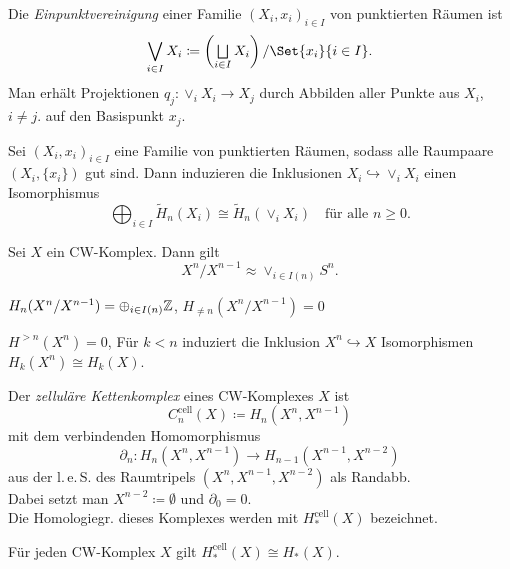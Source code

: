 \documentclass{cheat-sheet}
\newcommand{\RH}{\tilde{H}} %
\newcommand{\cell}{\text{cell}} %
\newcommand{\leS}{l.\,e.\,S.} %
\newcommand{\inlineitem}[1]{\textbullet \enspace #1} %
\begin{document}
\begin{defn}
  Die \emph{Einpunktvereinigung} einer Familie $(X_i, x_i)_{i \in I}$ von punktierten Räumen ist
  \[ \bigvee_{i \in I} X_i \coloneqq \left( \bigsqcup_{i \in I} X_i \right) / \Set{x_i}{i \in I}. \]
  Man erhält Projektionen $q_j : \vee_i X_i \to X_j$ durch Abbilden aller Punkte aus $X_i$, $i \not= j$. auf den Basispunkt $x_j$.
\end{defn}

\begin{prop}
  Sei $(X_i, x_i)_{i \in I}$ eine Familie von punktierten Räumen, sodass alle Raumpaare $(X_i, \{ x_i \})$ gut sind. Dann induzieren die Inklusionen $X_i \hookrightarrow \vee_i X_i$ einen Isomorphismus
  \[
    \bigoplus_{i \in I} \RH_n(X_i) \cong \RH_n\left( \vee_i X_i \right) \quad
    \text{für alle $n \geq 0$.}
  \]
\end{prop}

\begin{lem}
  Sei $X$ ein CW-Komplex. Dann gilt
  \[ X^n/X^{n-1} \approx \vee_{i \in I(n)} S^n. \]
\end{lem}

\begin{kor}
  \inlineitem{$H_n(X^n/X^{n-1}) = \oplus_{i \in I(n)} \mathbb{Z}$,} \quad
  \inlineitem{$H_{\not= n}(X^n/X^{n-1}) = 0$}
\end{kor}

\begin{prop}
  \inlineitem{$H^{>n}(X^n) = 0$,} \quad
  \inlineitem{Für $k < n$ induziert die Inklusion $X^n \hookrightarrow X$ Isomorphismen $H_k(X^n) \cong H_k(X)$.}
\end{prop}

\begin{defn}
  Der \emph{zelluläre Kettenkomplex} eines CW-Komplexes $X$ ist
  \[ C^\cell_n(X) \coloneqq H_n(X^n, X^{n-1}) \]
  mit dem verbindenden Homomorphismus
  \[ \partial_n : H_n(X^n, X^{n-1}) \to H_{n-1}(X^{n-1}, X^{n-2}) \]
  aus der \leS{} des Raumtripels $(X^n, X^{n-1}, X^{n-2})$ als Randabb.\\
  Dabei setzt man $X^{n-2} \coloneqq \emptyset$ und $\partial_0 = 0$.\\
  Die Homologiegr. dieses Komplexes werden mit $H_*^\cell(X)$ bezeichnet.
\end{defn}

\begin{prop}
  Für jeden CW-Komplex $X$ gilt $H_*^\cell(X) \cong H_*(X)$.
\end{prop}
\end{document}
